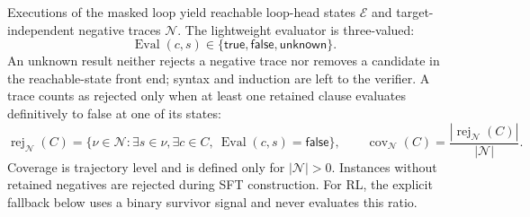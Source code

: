 Executions of the masked loop yield reachable loop-head states \(\mathcal E\)
and target-independent negative traces \(\mathcal N\).  The lightweight
evaluator is three-valued:
\begin{equation}
  \operatorname{Eval}(c,s)\in
  \{\mathsf{true},\mathsf{false},\mathsf{unknown}\}.
  \label{eq:formal-state-eval}
\end{equation}
An unknown result neither rejects a negative trace nor removes a candidate in
the reachable-state front end; syntax and induction are left to the verifier.
A trace counts as rejected only when at least one retained clause evaluates
definitively to false at one of its states:
\begin{equation}
  \operatorname{rej}_{\mathcal N}(C)
  =\{\nu\in\mathcal N:\exists s\in\nu,\exists c\in C,\
    \operatorname{Eval}(c,s)=\mathsf{false}\},
  \qquad
  \operatorname{cov}_{\mathcal N}(C)
  =\frac{|\operatorname{rej}_{\mathcal N}(C)|}{|\mathcal N|}.
  \label{eq:formal-coverage}
\end{equation}
Coverage is trajectory level and is defined only for
\(|\mathcal N|>0\).  Instances without retained negatives are rejected during
SFT construction.  For RL, the explicit fallback below uses a binary survivor
signal and never evaluates this ratio.

